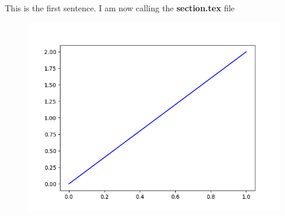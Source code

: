 \documentclass[12pt,a4paper]{article}
\begin{document}
This is the first sentence.
I am now calling the \textbf{section.tex} file

\begin{figure}
\includegraphics[scale=1]{img/fig2.png}
\end{figure}
\end{document}
